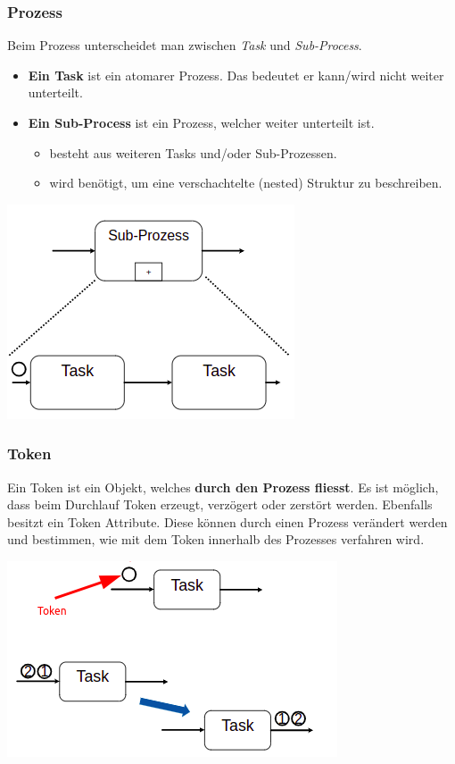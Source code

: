 \subsubsection{Prozess}
Beim Prozess unterscheidet man zwischen \textit{Task} und \textit{Sub-Process}.
\begin{itemize}
    \item \textbf{Ein Task} ist ein atomarer Prozess. Das bedeutet er kann/wird nicht weiter unterteilt.
    \item  \textbf{Ein Sub-Process} ist ein Prozess, welcher weiter unterteilt ist. 
    \begin{itemize}
        \item besteht aus weiteren Tasks und/oder Sub-Prozessen.
        \item wird benötigt, um eine verschachtelte (nested) Struktur zu beschreiben.
    \end{itemize}
\end{itemize}

\begin{minipage}[t]{1\textwidth}
    \centering
	\includegraphics[width=0.4\linewidth]{images/BPMN_process.png}
\end{minipage}

\subsubsection{Token}
Ein Token ist ein Objekt, welches \textbf{durch den Prozess fliesst}. Es ist möglich, dass beim Durchlauf Token erzeugt, verzögert oder zerstört werden. Ebenfalls besitzt ein Token Attribute. Diese können durch einen Prozess verändert werden und bestimmen, wie mit dem Token innerhalb des Prozesses verfahren wird.

\begin{minipage}[t]{1\textwidth}
    \centering
	\includegraphics[width=0.4\linewidth]{images/BPMN_token.png}
\end{minipage}

